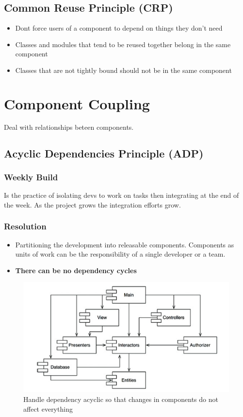 \documentclass[../Main.tex]{subfiles}
\begin{document}
\subsection{Common Reuse Principle (CRP)}
\begin{itemize}
    \item Dont force users of a component to depend on things they don't need
    \item Classes and modules that tend to be reused together belong in the same component
    \item Classes that are not tightly bound should not be in the same component
\end{itemize}

\section{Component Coupling}
Deal with relationships beteen components.
\subsection{Acyclic Dependencies Principle (ADP)}

\subsubsection{Weekly Build}
Is the practice of isolating devs to work on tasks then integrating at the end of the week.
As the project grows the integration efforts grow.

\subsubsection{Resolution}
\begin{itemize}
    \item Partitioning the development into releasable components.
    Components as units of work can be the responsibility of a single developer or a team.
    \item \textbf{There can be no dependency cycles}
\end{itemize}
\begin{figure}[H]
    \centering
    \includegraphics[width=0.75\linewidth]{Images/cleanarch/dependency-cycle.png}
    \caption{Handle dependency acyclic so that changes in components do not affect everything}
\end{figure}
\end{document}
